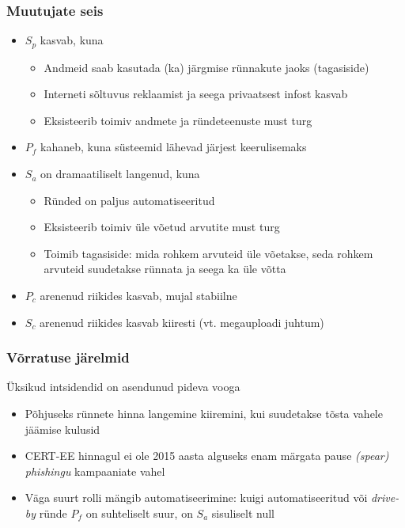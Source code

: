 \begin{frame}[fragile]
  \frametitle{Muutujate seis}
	\begin{itemize}
		\item $S_p$ kasvab, kuna 
			\begin{itemize}
				\item Andmeid saab kasutada (ka) järgmise rünnakute jaoks (tagasiside) 
				\item Interneti sõltuvus reklaamist ja seega privaatsest infost kasvab
				\item Eksisteerib toimiv andmete ja ründeteenuste must turg
			\end{itemize}
		\item $P_f$ kahaneb, kuna süsteemid lähevad järjest keerulisemaks
		\item $S_a$ on dramaatiliselt langenud, kuna 
			\begin{itemize}
				\item Ründed on paljus automatiseeritud
				\item Eksisteerib toimiv üle võetud arvutite must turg
				\item Toimib tagasiside: mida rohkem arvuteid üle võetakse, seda rohkem arvuteid suudetakse rünnata ja seega ka üle võtta
			\end{itemize}
		\item $P_c$ arenenud riikides kasvab, mujal stabiilne
		\item $S_c$ arenenud riikides kasvab kiiresti (vt. megauploadi juhtum)
	\end{itemize}
\end{frame}


\begin{frame}[fragile]
  \frametitle{Võrratuse järelmid}
	Üksikud intsidendid on asendunud pideva vooga
	\begin{itemize}
		\item Põhjuseks rünnete hinna langemine kiiremini, kui suudetakse tõsta vahele jäämise kulusid
		\item CERT-EE hinnagul ei ole 2015 aasta alguseks enam märgata pause \emph{(spear) phishingu} kampaaniate vahel
		\item Väga suurt rolli mängib automatiseerimine: kuigi automatiseeritud või \emph{drive-by} ründe $P_f$ on suhteliselt suur, on $S_a$ sisuliselt null
	\end{itemize}
\end{frame}

